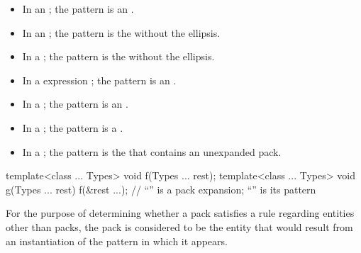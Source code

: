 \documentclass{wg21}
\begin{document}
\begin{itemize}
    \item In an  ; the pattern is
    an .

    \item In an  ; the pattern is
    the  without the ellipsis.

    \item In a  ; the pattern is
    the  without the ellipsis.

    \item In a  expression ; the pattern is an
    .

    \item In a ; the pattern is an
    .
    \item In a ; the pattern is a
    .


    \item In a  ;
    the pattern is the 
    that contains an unexpanded pack.
\end{itemize}

\begin{example} %
    \begin{codeblock}
        template<class ... Types> void f(Types ... rest);
        template<class ... Types> void g(Types ... rest) {
            f(&rest ...);     // ``'' is a pack expansion; ``'' is its pattern
        }
    \end{codeblock}
\end{example}

\pnum
For the purpose of determining whether a pack satisfies a rule
regarding entities other than packs, the pack is
considered to be the entity that would result from an instantiation of
the pattern in which it appears.
\end{document}
